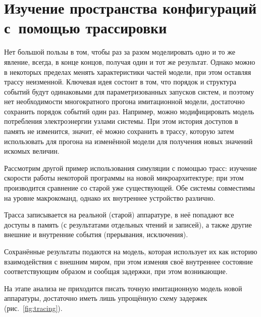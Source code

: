 \section[Изучение пространства конфигураций]{Изучение пространства конфигураций с~помощью трассировки}

Нет большой пользы в том, чтобы раз за разом моделировать одно и то же явление, всегда, в конце концов, получая один и тот же результат. Однако можно в некоторых пределах менять характеристики частей модели, при этом оставляя трассу неизменной. Ключевая идея состоит в том, что порядок и структура событий будут одинаковыми для параметризованных запусков систем, и поэтому нет необходимости многократного прогона имитационной модели, достаточно сохранить порядок событий один раз. Например, можно модифицировать модель потребления электроэнергии узлами системы. При этом история доступов в память не изменится, значит, её можно сохранить в трассу, которую затем использовать для прогона на изменённой модели для получения новых значений искомых величин.

Рассмотрим другой пример использования  симуляции с помощью трасс: изучение скорости работы некоторой программы на новой микроархитектуре; при этом производится сравнение со старой уже существующей. Обе системы совместимы на уровне макрокоманд, однако их внутреннее устройство различно. 

\begin{enumerate*}
    \item Трасса записывается на реальной (старой) аппаратуре, в неё попадают все доступы в память (с результатами отдельных чтений и записей), а также другие внешние и внутренние события (прерывания, исключения). 
    \item Сохранённые результаты подаются на модель, которая использует их как историю взаимодействия с внешним миром, при этом изменяя своё внутреннее состояние соответствующим образом и сообщая задержки, при этом возникающие. 
    \item На этапе анализа не приходится писать точную имитационную модель новой аппаратуры, достаточно иметь лишь упрощённую схему задержек (рис.~\ref{fig:tracing}).
\end{enumerate*}

